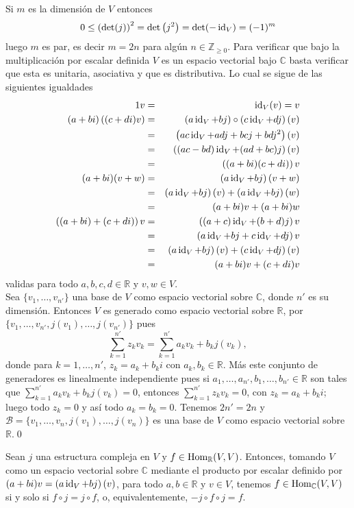 \dem Si $m$ es la dimensi\'on de $V$ entonces 
\[
0\le\left(\det(j)\right)^2=\det\left(j^2\right)=\det(-\operatorname{id}_V)=(-1)^m
\]
luego $m$ es par, es decir $m=2n$ para alg\'un $n\in\mathbb{Z}_{\ge 0}$. Para verificar que bajo la multiplicaci\'on por escalar definida $V$ es un espacio vectorial bajo $\mathbb{C}$ basta verificar que esta es unitaria, asociativa y que es distributiva. Lo cual se sigue de las siguientes igualdades
\begin{eqnarray*}
1v & = & \operatorname{id}_V(v)=v \\
(a+bi)\left((c+di)v\right) & = &  \left(a\operatorname{id}_V+bj\right)\circ\left(c\operatorname{id}_V+dj\right)(v) \\
                     & = & \left(ac\operatorname{id}_V+adj+bcj+bdj^2\right)(v)\\
                     & = & \left((ac-bd)\operatorname{id}_V+(ad+bc)j\right)(v)\\
                     & = & \left((a+bi)(c+di)\right)v\\
(a+bi)(v+w) & = & \left(a\operatorname{id}_V+bj\right)(v+w)\\
                   & = & \left(a\operatorname{id}_V+bj\right)(v)+\left(a\operatorname{id}_V+bj\right)(w)\\
                   & = & (a+bi)v+(a+bi)w\\
\left((a+bi)+(c+di)\right)v & = & \left((a+c)\operatorname{id}_V+(b+d)j\right)v\\
    & = & \left(a\operatorname{id}_V+bj+c\operatorname{id}_V+dj\right)v\\
    & = & \left(a\operatorname{id}_V+bj\right)(v)+\left(c\operatorname{id}_V+dj\right)(v)\\
    & = & (a+bi)v+(c+di)v
\end{eqnarray*}
validas para todo $a,b,c,d\in\mathbb{R}$ y $v,w\in V$.\\
Sea $\{v_1,\ldots,v_{n'}\}$ una base de $V$ como espacio vectorial sobre $\mathbb{C}$, donde $n'$ es su dimensi\'on. Entonces $V$ es generado como espacio vectorial sobre $\mathbb{R}$, por $\{v_1,\ldots,v_{n'},j(v_1),\ldots,j(v_{n'})\}$ pues
\[
\sum_{k=1}^{n'}z_kv_k=\sum_{k=1}^{n'}a_kv_k+b_kj(v_k),
\]
donde para $k=1,\ldots,n'$, $z_k=a_k+b_ki$ con $a_k,b_k\in\mathbb{R}$. M\'as este conjunto de generadores es linealmente independiente pues si $a_1,\ldots,a_{n'},b_1,\ldots,b_{n'}\in\mathbb{R}$ son tales que $\sum_{k=1}^{n'}a_kv_k+b_kj(v_k)=0$, entonces $\sum_{k=1}^{n'}z_kv_k=0$, con $z_k=a_k+b_ki$; luego todo $z_k=0$ y as\'i todo $a_k=b_k=0$. Tenemos $2n'=2n$ y $\mathcal{B}=\{v_1,\ldots,v_n,j(v_1),\ldots,j(v_n)\}$ es una base de $V$ como espacio vectorial sobre $\mathbb{R}$.\qed

\begin{pro}\label{proestlcom}
Sean $j$ una estructura compleja en $V$ y $f\in\operatorname{Hom}_{\mathbb{R}}(V,V)$. Entonces, tomando $V$ como un espacio vectorial sobre $\mathbb{C}$ mediante el producto por escalar definido por $(a+bi)v=\left(a\operatorname{id}_V+bj\right)(v)$, para todo $a,b\in\mathbb{R}$ y $v\in V$, tenemos $f\in\operatorname{Hom}_{\mathbb{C}}(V,V)$ si y solo si  $f\circ j=j\circ f$, o, equivalentemente, $-j\circ f\circ j=f$.
\end{pro}

